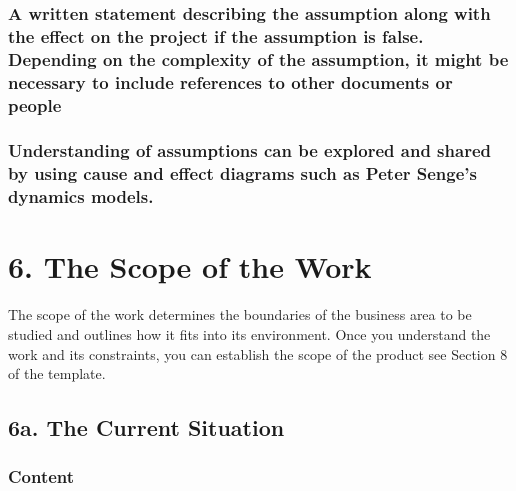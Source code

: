 \documentclass[
]{article}
\begin{document}
\hypertarget{a-written-statement-describing-the-assumption-along-with-the-effect-on-the-project-if-the-assumption-is-false.-depending-on-the-complexity-of-the-assumption-it-might-be-necessary-to-include-references-to-other-documents-or-people}{%
\subsubsection{A written statement describing the assumption along with
the effect on the project if the assumption is false. Depending on the
complexity of the assumption, it might be necessary to include
references to other documents or
people}\label{a-written-statement-describing-the-assumption-along-with-the-effect-on-the-project-if-the-assumption-is-false.-depending-on-the-complexity-of-the-assumption-it-might-be-necessary-to-include-references-to-other-documents-or-people}}

\hypertarget{understanding-of-assumptions-can-be-explored-and-shared-by-using-cause-and-effect-diagrams-such-as-peter-senges-dynamics-models.}{%
\subsubsection{Understanding of assumptions can be explored and shared
by using cause and effect diagrams such as Peter Senge's dynamics
models.}\label{understanding-of-assumptions-can-be-explored-and-shared-by-using-cause-and-effect-diagrams-such-as-peter-senges-dynamics-models.}}

\hypertarget{the-scope-of-the-work}{%
\section{6. The Scope of the Work}\label{the-scope-of-the-work}}

The scope of the work determines the boundaries of the business area to
be studied and outlines how it fits into its environment. Once you
understand the work and its constraints, you can establish the scope of
the product see Section 8 of the template.

\hypertarget{a.-the-current-situation}{%
\subsection{6a. The Current Situation}\label{a.-the-current-situation}}

\hypertarget{content-22}{%
\subsubsection{Content}\label{content-22}}
\end{document}
